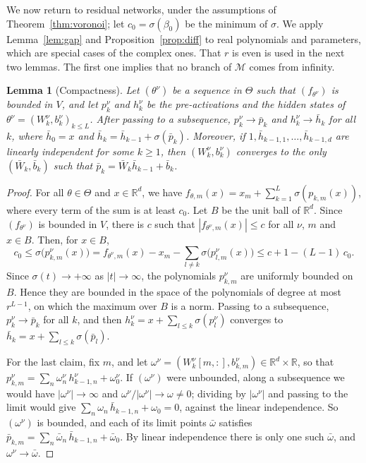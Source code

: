 \documentclass[11pt]{article}
\newtheorem{lemma}{Lemma}
\theoremstyle{definition}
\theoremstyle{remark}
\newcommand{\R}{\mathbb{R}}
\newcommand{\M}{\mathcal{M}}
\begin{document}
We now return to residual networks, under the assumptions of Theorem~\ref{thm:voronoi}; let $c_0=\sigma(\beta_0)$ be the minimum of $\sigma$. We apply Lemma~\ref{lem:gap} and Proposition~\ref{prop:diff} to real polynomials and parameters, which are special cases of the complex ones. That $r$ is even is used in the next two lemmas. The first one implies that no branch of $\M$ comes from infinity.

\begin{lemma}[Compactness]\label{lem:compact}
Let $(\theta^\nu)$ be a sequence in $\Theta$ such that $(f_{\theta^\nu})$ is bounded in $V$, and let $p^\nu_k$ and $h^\nu_k$ be the pre-activations and the hidden states of $\theta^\nu=(W^\nu_k,b^\nu_k)_{k\le L}$. After passing to a subsequence, $p^\nu_k\to\bar p_k$ and $h^\nu_k\to\bar h_k$ for all $k$, where $\bar h_0=x$ and $\bar h_k=\bar h_{k-1}+\sigma(\bar p_k)$. Moreover, if $1,\bar h_{k-1,1},\dots,\bar h_{k-1,d}$ are linearly independent for some $k\ge1$, then $(W^\nu_k,b^\nu_k)$ converges to the only $(\bar W_k,\bar b_k)$ such that $\bar p_k=\bar W_k\bar h_{k-1}+\bar b_k$.
\end{lemma}

\begin{proof}
For all $\theta\in\Theta$ and $x\in\R^d$, we have $f_{\theta,m}(x)=x_m+\sum_{k=1}^L\sigma(p_{k,m}(x))$, where every term of the sum is at least $c_0$. Let $B$ be the unit ball of $\R^d$. Since $(f_{\theta^\nu})$ is bounded in $V$, there is $c$ such that $|f_{\theta^\nu,m}(x)|\le c$ for all $\nu$, $m$ and $x\in B$. Then, for $x\in B$,
\[
c_0\le\sigma\big(p^\nu_{k,m}(x)\big)=f_{\theta^\nu,m}(x)-x_m-\sum_{l\ne k}\sigma\big(p^\nu_{l,m}(x)\big)\le c+1-(L-1)\,c_0.
\]
Since $\sigma(t)\to+\infty$ as $|t|\to\infty$, the polynomials $p^\nu_{k,m}$ are uniformly bounded on $B$. Hence they are bounded in the space of the polynomials of degree at most $r^{L-1}$, on which the maximum over $B$ is a norm. Passing to a subsequence, $p^\nu_k\to\bar p_k$ for all $k$, and then $h^\nu_k=x+\sum_{l\le k}\sigma(p^\nu_l)$ converges to $\bar h_k=x+\sum_{l\le k}\sigma(\bar p_l)$.

For the last claim, fix $m$, and let $\omega^\nu=(W^\nu_k[m,:],b^\nu_{k,m})\in\R^d\times\R$, so that $p^\nu_{k,m}=\sum_n\omega^\nu_n\,h^\nu_{k-1,n}+\omega^\nu_0$. If $(\omega^\nu)$ were unbounded, along a subsequence we would have $|\omega^\nu|\to\infty$ and $\omega^\nu/|\omega^\nu|\to\omega\ne0$; dividing by $|\omega^\nu|$ and passing to the limit would give $\sum_n\omega_n\,\bar h_{k-1,n}+\omega_0=0$, against the linear independence. So $(\omega^\nu)$ is bounded, and each of its limit points $\bar\omega$ satisfies $\bar p_{k,m}=\sum_n\bar\omega_n\,\bar h_{k-1,n}+\bar\omega_0$. By linear independence there is only one such $\bar\omega$, and $\omega^\nu\to\bar\omega$.
\end{proof}
\end{document}
